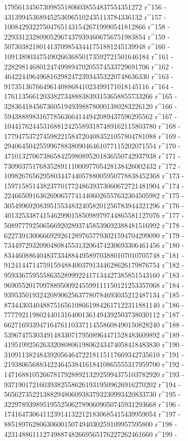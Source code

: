        179561345673098551806038554837554351272 r^156 - 
       431399453689452536965102435113784336132 r^157 - 
       1008429322750476514315426719990541812866 r^158 - 
       2293312328090529674379394606756751983854 r^159 - 
       5073038218014137098543441751881245139948 r^160 - 
       10913890347549026636850173592721501646184 r^161 - 
       22829814680124749989470205574533729691706 r^162 - 
       46422449649681629824723934353220748636330 r^163 - 
       91735136766496140886841023499171018145116 r^164 - 
       176113566120338273488838393153658855733266 r^165 - 
       328364184567360519493988780001380283226120 r^166 - 
       594388898316778563664144942089437596295562 r^167 - 
       1044176244531688124255893187489162115803780 r^168 - 
       1779475372745982215847204083521057804781088 r^169 - 
       2940645042559967883809046461077115202071554 r^170 - 
       4710132706738658425980895201836550742937938 r^171 - 
       7309037517683528911100097705428138426002432 r^172 - 
       10982676562958034474405788005950778838452368 r^173 - 
       15971585143823770177248639373060672721481904 r^174 - 
       22466509163626906577414406026557632304505982 r^175 - 
       30549969208395155348324058201256783944321296 r^176 - 
       40132533874154629901585098979744865581127076 r^177 - 
       50897779250656692028937458539692388481516992 r^178 - 
       62273913006669292612897657793021594704299090 r^179 - 
       73449729320904808455313206474230693306461456 r^180 - 
       83446088640483733488449589703880107010705748 r^181 - 
       91241447147591594884003791344628626179876754 r^182 - 
       95933675955586352899922417134427385851543160 r^183 - 
       96905520170978895009245599111150121253357068 r^184 - 
       93953501932420890625637780784693035212487134 r^185 - 
       87344303404887516561086619842617122311881140 r^186 - 
       77779211980244013164001361494392503738030112 r^187 - 
       66271693394716476110337114558608490150828240 r^188 - 
       53967475303491483307179508964471528483609892 r^189 - 
       41951992562633208080619806243474058418483830 r^190 - 
       31091138248439205646472218115117669342735610 r^191 - 
       21938065688342246453841618410865555317959700 r^192 - 
       14716881052667817928892132925994375103782920 r^193 - 
       9371901721603938255862619319509626916270202 r^194 - 
       5656273522138829480609383793230993420833730 r^195 - 
       3229789398951955250627890609050745931293668 r^196 - 
       1741647306411239141322121830685415439959054 r^197 - 
       885189762806306001507494030259109957595800 r^198 - 
       423148861112749887482669565176227262461660 r^199 - 
